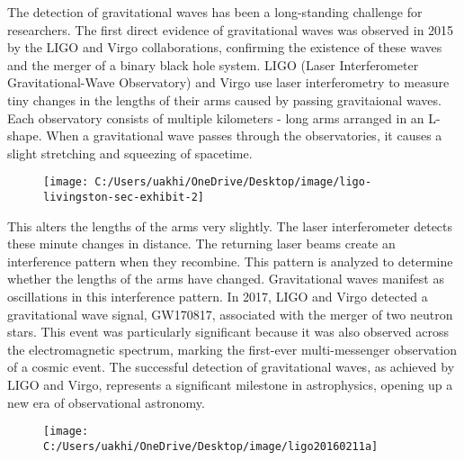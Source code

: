 The detection of gravitational waves has been a long-standing challenge for researchers. The first direct evidence of gravitational waves was observed in 2015 by the LIGO and Virgo collaborations, confirming the existence of these waves and the merger of a binary black hole system. LIGO (Laser Interferometer Gravitational-Wave Observatory) and Virgo use laser interferometry to measure tiny changes in the lengths of their arms caused by passing gravitaional waves. Each observatory consists of multiple kilometers - long arms arranged in an L-shape. When a gravitational wave passes through the observatories, it causes a slight stretching and squeezing of spacetime.
\begin{figure}
	\centering
	\texttt{[image: C:/Users/uakhi/OneDrive/Desktop/image/ligo-livingston-sec-exhibit-2]}
	\caption{}
	\label{fig:ligo-livingston-sec-exhibit-2}
\end{figure}
This alters the lengths of the arms very slightly. The laser interferometer detects these minute changes in distance. The returning laser beams create an 
interference pattern when they recombine. This pattern is analyzed to determine whether the lengths of the arms have changed. Gravitational waves manifest as oscillations in this interference pattern. In 2017, LIGO and Virgo detected a gravitational wave signal, GW170817, associated with the merger of two neutron stars. This event was particularly significant because it was also observed across the electromagnetic spectrum, marking the first-ever multi-messenger observation of a cosmic event. The successful detection of gravitational waves, as achieved by LIGO and Virgo, represents a significant milestone in astrophysics, opening up a new era of observational astronomy.
\begin{figure}
	\centering
	\texttt{[image: C:/Users/uakhi/OneDrive/Desktop/image/ligo20160211a]}
	\caption{}
	\label{fig:ligo20160211a}
\end{figure}





























